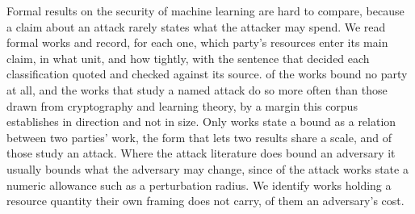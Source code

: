 Formal results on the security of machine learning are hard to compare, because a
claim about an attack rarely states what the attacker may spend. We read
\NumSources{} formal works and record, for each one, which party's resources enter
its main claim, in what unit, and how tightly, with the sentence that decided each
classification quoted and checked against its source. \NumUnstated{} of the works
bound no party at all, and the works that study a named attack do so more often
than those drawn from cryptography and learning theory, by a margin this corpus
establishes in direction and not in size. Only \NumRelative{} works state a bound
as a relation between two parties' work, the form that lets two results share a
scale, and \NumRelativeAttack{} of those study an attack. Where the attack
literature does bound an adversary it usually bounds what the adversary may change,
since \AttackBudget{} of the \NumAttackWorks{} attack works state a numeric
allowance such as a perturbation radius. We identify \NearMiss{} works holding a
resource quantity their own framing does not carry, \NearMissAdv{} of them an
adversary's cost.

